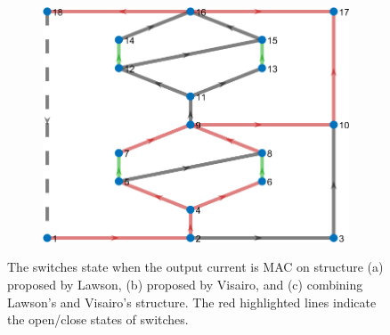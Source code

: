 \documentclass{article}
\begin{document}
\begin{figure}[htbp]
    \begin{subfigure}[b]{0.45\textwidth}
        \includegraphics[width=\textwidth]{../attachments/e2f2-dege-mac.png}
        \caption{}
        \label{fig:d-structure-e2f2}
    \end{subfigure}
    \caption{
        The switches state when the output current is MAC on structure (a) proposed by Lawson\cite{lawsonSoftwareConfigurableBattery2012}, (b) proposed by Visairo\cite{visairoReconfigurableBatteryPack2008}, and (c) combining  Lawson's and Visairo's structure. 
        The red highlighted lines indicate the open/close states of switches.
        }
    \label{fig:d-structure}
\end{figure}
\end{document}
